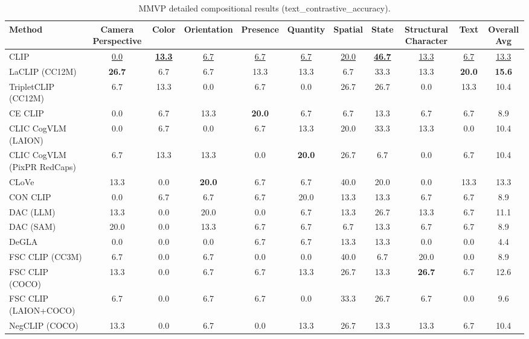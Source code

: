 \begin{table}[t]
  \centering
  \scriptsize
  \caption{MMVP detailed compositional results (text_contrastive_accuracy).}
  \label{tab:MMVP_detailed}
  \begin{adjustbox}{max width=\textwidth}
  \setlength{\tabcolsep}{2pt}
  \begin{tabular}{p{5cm}c|c|c|c|c|c|c|c|c|c}
    \toprule
    Method & Camera Perspective & Color & Orientation & Presence & Quantity & Spatial & State & Structural Character & Text & Overall Avg \\
    \midrule
    CLIP & \underline{0.0} & \underline{\textbf{13.3}} & \underline{6.7} & \underline{6.7} & \underline{6.7} & \underline{20.0} & \underline{\textbf{46.7}} & \underline{13.3} & \underline{6.7} & \underline{13.3} \\
    \midrule
    LaCLIP (CC12M) & \textbf{26.7} & 6.7 & 6.7 & 13.3 & 13.3 & 6.7 & 33.3 & 13.3 & \textbf{20.0} & \textbf{15.6} \\
    TripletCLIP (CC12M) & 6.7 & 13.3 & 0.0 & 6.7 & 0.0 & 26.7 & 26.7 & 0.0 & 13.3 & 10.4 \\
    \midrule
    CE CLIP & 0.0 & 6.7 & 13.3 & \textbf{20.0} & 6.7 & 6.7 & 13.3 & 6.7 & 6.7 & 8.9 \\
    CLIC CogVLM (LAION) & 0.0 & 6.7 & 0.0 & 6.7 & 13.3 & 20.0 & 33.3 & 13.3 & 0.0 & 10.4 \\
    CLIC CogVLM (PixPR RedCaps) & 6.7 & 13.3 & 13.3 & 0.0 & \textbf{20.0} & 26.7 & 6.7 & 0.0 & 6.7 & 10.4 \\
    CLoVe & 13.3 & 0.0 & \textbf{20.0} & 6.7 & 6.7 & 40.0 & 20.0 & 0.0 & 13.3 & 13.3 \\
    CON CLIP & 0.0 & 6.7 & 6.7 & 6.7 & 20.0 & 13.3 & 13.3 & 6.7 & 6.7 & 8.9 \\
    DAC (LLM) & 13.3 & 0.0 & 20.0 & 0.0 & 6.7 & 13.3 & 26.7 & 13.3 & 6.7 & 11.1 \\
    DAC (SAM) & 20.0 & 0.0 & 13.3 & 6.7 & 6.7 & 6.7 & 13.3 & 6.7 & 6.7 & 8.9 \\
    DeGLA & 0.0 & 0.0 & 0.0 & 6.7 & 6.7 & 13.3 & 13.3 & 0.0 & 0.0 & 4.4 \\
    FSC CLIP (CC3M) & 6.7 & 0.0 & 6.7 & 0.0 & 0.0 & 40.0 & 6.7 & 20.0 & 0.0 & 8.9 \\
    FSC CLIP (COCO) & 13.3 & 0.0 & 6.7 & 6.7 & 13.3 & 26.7 & 13.3 & \textbf{26.7} & 6.7 & 12.6 \\
    FSC CLIP (LAION+COCO) & 6.7 & 0.0 & 6.7 & 6.7 & 0.0 & 33.3 & 26.7 & 6.7 & 0.0 & 9.6 \\
    NegCLIP (COCO) & 13.3 & 0.0 & 6.7 & 0.0 & 13.3 & 26.7 & 13.3 & 13.3 & 6.7 & 10.4 \\

\end{tabular}
\end{adjustbox}
\end{table}
